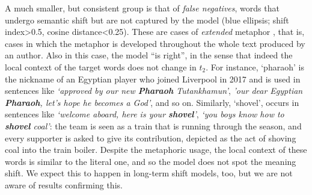 A much smaller, but consistent group is that of \textit{false negatives}, 
words that undergo semantic shift but are not captured by the model
(blue ellipsis; shift index\textgreater 0.5, cosine distance\textless 0.25).
These are cases of \textit{extended}
metaphor \cite{werth1994extended}, that is, cases in which the metaphor is 
developed throughout the whole text produced by an author. Also in this case, the model ``is right'', in the sense that indeed
the local context of the target words does not change in $t_2$.
For instance, `pharaoh' is the nickname of an Egyptian player who
joined Liverpool in 2017 and is used in
sentences like \textit{`approved by our new \textbf{Pharaoh}
  Tutankhamun'}, \textit{'our dear Egyptian \textbf{Pharaoh},
  let's hope he becomes a God'}, and so on. Similarly, `shovel',  occurs in sentences
like \textit{`welcome aboard, here is your \textbf{shovel}'},
\textit{`you boys know how to \textbf{shovel} coal'}: the team is seen as a train that is running through the season, and every supporter is asked to give its contribution, depicted as the act of shoving coal into the train boiler. Despite the metaphoric usage, the local context of these words is similar to the literal one, and so the model does not spot the meaning shift. We expect this to happen in long-term shift models, too, but we are not aware of results confirming this.


